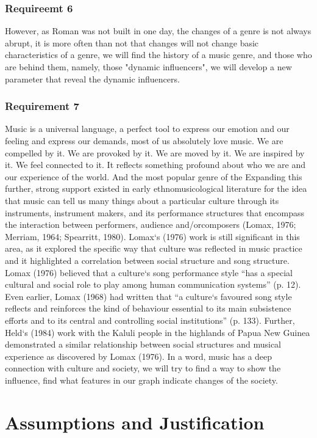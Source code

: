 \documentclass[12pt]{article}
\begin{document}
\subsubsection{Requireemt 6}
However, as Roman was not built in one day, the changes of a genre is not always abrupt, it is more often than not that changes will not change basic characteristics of
a genre, we will find the history of a music genre, and those who are behind them, namely, those "dynamic influencers", we will develop a new parameter
that reveal the dynamic influencers.
\subsubsection{Requirement 7}
Music is a universal language, a perfect tool to express our emotion and our feeling and express our demands, most of us absolutely love music. We are compelled by it. We are provoked by it.
We are moved by it. We are inspired by it. We feel connected to it. It reflects something profound about who we are and our experience of the world. And the most popular
genre of the Expanding this further, strong support existed in early ethnomusicological literature for the idea that music can tell us many things about a particular culture through its instruments,
instrument makers, and its performance structures that encompass the interaction between performers, audience and/orcomposers (Lomax, 1976; Merriam, 1964; Spearritt, 1980). Lomax`s (1976) work is still
significant in this area, as it explored the specific way that culture was reflected in music practice and it highlighted a correlation between social structure and
song structure. Lomax (1976) believed that a culture`s song performance style “has a special cultural and social role to play among human communication systems” (p. 12).
Even earlier, Lomax (1968) had written that “a culture`s favoured song style reflects and reinforces the kind of behaviour essential to its main subsistence efforts and
to its central and controlling social institutions” (p. 133). Further, Held`s (1984) work with
the Kaluli people in the highlands of Papua New Guinea demonstrated a similar relationship between social structures and musical experience as discovered by Lomax (1976).
In a word, music has a deep connection with culture and society, we will try to find a way to show the influence, find what features in our graph indicate changes of the
society.
\section{Assumptions and Justification}
\end{document}
